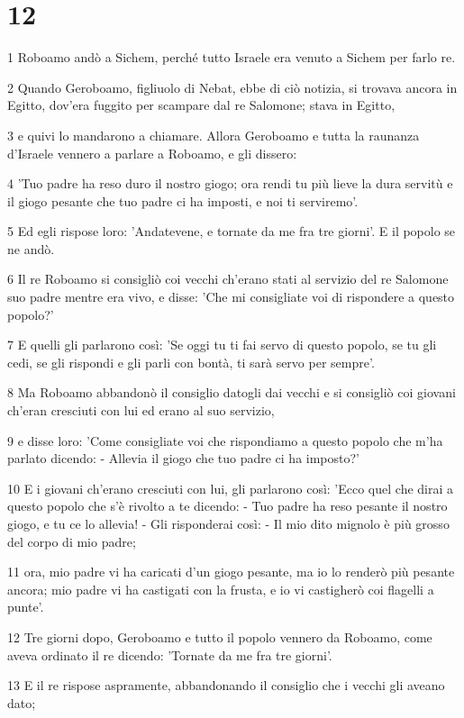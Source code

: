\chapter{12}

\par 1 Roboamo andò a Sichem, perché tutto Israele era venuto a Sichem per farlo re.
\par 2 Quando Geroboamo, figliuolo di Nebat, ebbe di ciò notizia, si trovava ancora in Egitto, dov'era fuggito per scampare dal re Salomone; stava in Egitto,
\par 3 e quivi lo mandarono a chiamare. Allora Geroboamo e tutta la raunanza d'Israele vennero a parlare a Roboamo, e gli dissero:
\par 4 'Tuo padre ha reso duro il nostro giogo; ora rendi tu più lieve la dura servitù e il giogo pesante che tuo padre ci ha imposti, e noi ti serviremo'.
\par 5 Ed egli rispose loro: 'Andatevene, e tornate da me fra tre giorni'. E il popolo se ne andò.
\par 6 Il re Roboamo si consigliò coi vecchi ch'erano stati al servizio del re Salomone suo padre mentre era vivo, e disse: 'Che mi consigliate voi di rispondere a questo popolo?'
\par 7 E quelli gli parlarono così: 'Se oggi tu ti fai servo di questo popolo, se tu gli cedi, se gli rispondi e gli parli con bontà, ti sarà servo per sempre'.
\par 8 Ma Roboamo abbandonò il consiglio datogli dai vecchi e si consigliò coi giovani ch'eran cresciuti con lui ed erano al suo servizio,
\par 9 e disse loro: 'Come consigliate voi che rispondiamo a questo popolo che m'ha parlato dicendo: - Allevia il giogo che tuo padre ci ha imposto?'
\par 10 E i giovani ch'erano cresciuti con lui, gli parlarono così: 'Ecco quel che dirai a questo popolo che s'è rivolto a te dicendo: - Tuo padre ha reso pesante il nostro giogo, e tu ce lo allevia! - Gli risponderai così: - Il mio dito mignolo è più grosso del corpo di mio padre;
\par 11 ora, mio padre vi ha caricati d'un giogo pesante, ma io lo renderò più pesante ancora; mio padre vi ha castigati con la frusta, e io vi castigherò coi flagelli a punte'.
\par 12 Tre giorni dopo, Geroboamo e tutto il popolo vennero da Roboamo, come aveva ordinato il re dicendo: 'Tornate da me fra tre giorni'.
\par 13 E il re rispose aspramente, abbandonando il consiglio che i vecchi gli aveano dato;
